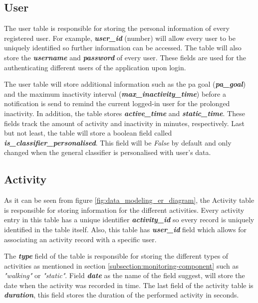         \subsection{User}
        The user table is responsible for storing the personal information of every registered user. For example, \textbf{\textit{user\_id}} (number) will allow every user to be uniquely identified so further information can be accessed. The table will also store the \textbf{\textit{username}} and \textbf{\textit{password}} of every user. These fields are used for the authenticating different users of the application upon login.
        
        The user table will store additional information such as the \gls{pa} goal (\textbf{\textit{pa\_goal}}) and the maximum inactivity interval (\textbf{\textit{max\_inactivity\_time}}) before a notification is send to remind the current logged-in user for the prolonged inactivity. In addition, the table stores \textbf{\textit{active\_time}} and \textbf{\textit{static\_time}}. These fields track the amount of activity and inactivity in minutes, respectively. Last but not least, the table will store a boolean field called \textbf{\textit{is\_classifier\_personalised}}. This field will be \textit{False} by default and only changed when the general classifier is personalised with user's data.
        
        \subsection{Activity}
        As it can be seen from figure \ref{fig:data_modeling_er_diagram}, the Activity table is responsible for storing information for the different activities. Every activity entry in this table has a unique identifier \textbf{\textit{activity\_id}} so every record is uniquely identified in the table itself. Also, this table has \textbf{\textit{user\_id}} field which allows for associating an activity record with a specific user.
        
        The \textbf{\textit{type}} field of the table is responsible for storing the different types of activities as mentioned in section \ref{subsection:monitoring-component} such as \textit{"walking"} or \textit{"static"}. Field \textbf{\textit{date}} as the name of the field suggest, will store the date when the activity was recorded in time. The last field of the activity table is \textbf{\textit{duration}}, this field stores the duration of the performed activity in seconds.
        
